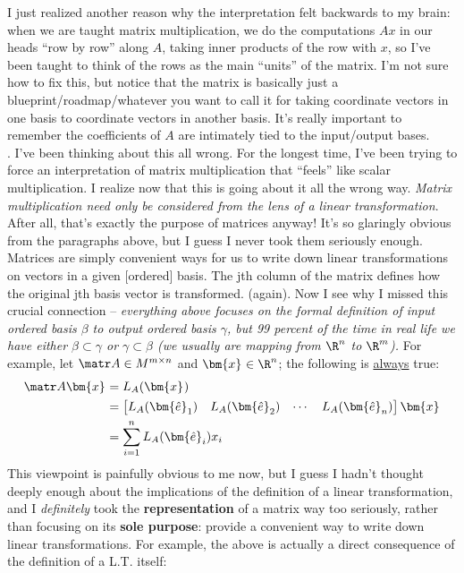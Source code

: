 \documentclass[11pt]{article}
\renewcommand\vec[2][]{\bm{#2}_{#1}}
\begin{document}
I just realized another reason why the interpretation felt backwards to my brain: when we are taught matrix multiplication, we do the computations $Ax$ in our heads ``row by row'' along $A$, taking inner products of the row with $x$, so I've been taught to think of the rows as the main ``units'' of the matrix. I'm not sure how to fix this, but notice that the matrix is basically just a blueprint/roadmap/whatever you want to call it for taking coordinate vectors in one basis to coordinate vectors in another basis. It's really important to remember the coefficients of $A$ are intimately tied to the input/output bases.  \\

. I've been thinking about this all wrong. For the longest time, I've been trying to force an interpretation of matrix multiplication that ``feels'' like scalar multiplication. I realize now that this is going about it all the wrong way. \textit{Matrix multiplication need only be considered from the lens of a linear transformation}. After all, that's exactly the purpose of matrices anyway! It's so glaringly obvious from the paragraphs above, but I guess I never took them seriously enough. Matrices are simply convenient ways for us to write down linear transformations on vectors in a given [ordered] basis. The jth column of the matrix defines how the original jth basis vector is transformed.  (again). Now I see why I missed this crucial connection -- \textit{everything above focuses on the formal definition of input ordered basis $\beta$ to output ordered basis $\gamma$, but 99 percent of the time in real life we have either $\beta \subset \gamma$ or $\gamma \subset \beta$ (we usually are mapping from $\R^n$ to $\R^m$). } For example, let $\matr A \in M^{m \times n}$ and $\vec x \in \R^{n}$; the following is \underline{always} true:
\begin{align}
	\matr A \vec x
		&= L_A(\vec x) \\
		&= \begin{bmatrix}
			L_A(\vec[1]{\hat e}) & L_A(\vec[2]{\hat e}) & \cdots & L_A(\vec[n]{\hat e})
		\end{bmatrix}
		\vec x \\
		&= \sum_{i = 1}^{n} L_A(\vec[i]{\hat e}) x_i
\end{align}
This viewpoint is painfully obvious to me now, but I guess I hadn't thought deeply enough about the implications of the definition of a linear transformation, and I \textit{definitely} took the \textbf{representation} of a matrix way too seriously, rather than focusing on its \textbf{sole purpose}: provide a convenient way to write down linear transformations. For example, the above is actually a direct consequence of the definition of a L.T. itself:
\end{document}
